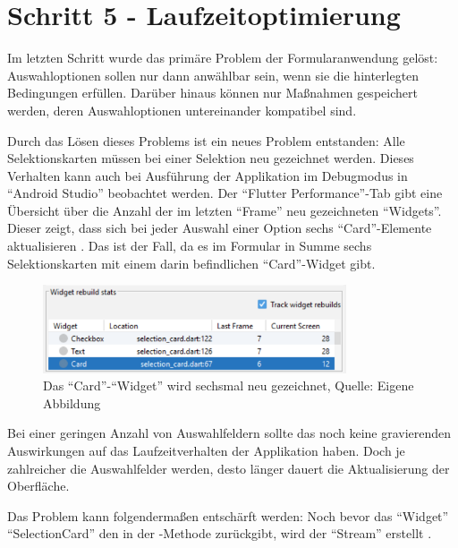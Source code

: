 \chapter{Schritt 5 - Laufzeitoptimierung}
\label{chap:Schritt-5}

Im letzten Schritt wurde das primäre Problem der Formularanwendung gelöst:
Auswahloptionen sollen nur dann anwählbar sein,
wenn sie die hinterlegten Bedingungen erfüllen.
Darüber hinaus können nur Maßnahmen gespeichert werden,
deren Auswahloptionen untereinander kompatibel sind.

Durch das Lösen dieses Problems ist ein neues Problem entstanden:
Alle Selektionskarten müssen bei einer Selektion neu gezeichnet werden.
Dieses Verhalten kann auch bei Ausführung der Applikation im Debugmodus in \enquote{Android Studio} beobachtet werden.
Der \enquote{Flutter Performance}-Tab gibt eine Übersicht über die Anzahl der im letzten \enquote{Frame} neu gezeichneten \enquote{Widgets}. 
Dieser zeigt, dass sich bei jeder Auswahl einer Option sechs \enquote{Card}-Elemente aktualisieren \Abb{\ref{fig:Schritt5_6rebuilds}}.
Das ist der Fall, da es im Formular in Summe sechs Selektionskarten mit einem darin befindlichen \enquote{Card}-Widget gibt.

\begin{figure}[ht]
  \centering
  \ifIncludeFigures
  \includegraphics[width=0.8\textwidth]{Inhalt/Hauptteil/Implementierung/Schritt-5/6rebuilds.png}
  \fi
  \caption[Das \enquote{Card}-\enquote{Widget} wird sechsmal neu gezeichnet]{Das \enquote{Card}-\enquote{Widget} wird sechsmal neu gezeichnet, Quelle: Eigene Abbildung}
  
  \label{fig:Schritt5_6rebuilds}
\end{figure}%


Bei einer geringen Anzahl von Auswahlfeldern sollte das noch keine gravierenden Auswirkungen auf das Laufzeitverhalten der Applikation haben.
Doch je zahlreicher die Auswahlfelder werden,
desto länger dauert die Aktualisierung der Oberfläche.

\clearpage
Das Problem kann folgendermaßen entschärft werden:
Noch bevor das \enquote{Widget} \enquote{SelectionCard} den  in der -Methode zurückgibt,
wird der \enquote{Stream}  erstellt .

